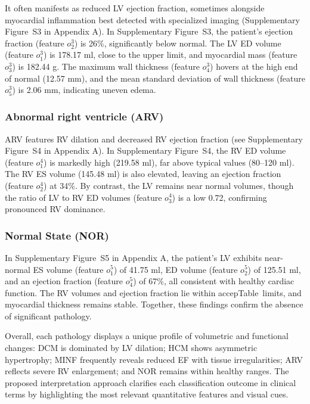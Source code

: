\documentclass[fleqn,10pt]{wlscirep}
\begin{document}
It often manifests as reduced LV ejection fraction, sometimes alongside myocardial inflammation best detected with specialized imaging (Supplementary Figure~S3 in Appendix A). In Supplementary Figure~S3, the patient's ejection fraction (feature \(o_2^3\)) is 26\%, significantly below normal. The LV ED volume (feature \(o_1^3\)) is 178.17 ml, close to the upper limit, and myocardial mass (feature \(o_3^3\)) is 182.44 g. The maximum wall thickness (feature \(o_4^3\)) hovers at the high end of normal (12.57 mm), and the mean standard deviation of wall thickness (feature \(o_5^3\)) is 2.06 mm, indicating uneven edema.

\subsubsection*{Abnormal right ventricle (ARV)}

ARV features RV dilation and decreased RV ejection fraction (see Supplementary Figure~S4 in Appendix A). In Supplementary Figure~S4, the RV ED volume (feature \(o_1^4\)) is markedly high (219.58 ml), far above typical values (80--120 ml). The RV ES volume (145.48 ml) is also elevated, leaving an ejection fraction (feature \(o_2^4\)) at 34\%. By contrast, the LV remains near normal volumes, though the ratio of LV to RV ED volumes (feature \(o_3^4\)) is a low 0.72, confirming pronounced RV dominance.

\subsubsection*{Normal State (NOR)}

In Supplementary Figure~S5 in Appendix A, the patient's LV exhibits near-normal ES volume (feature \(o_1^5\)) of 41.75 ml, ED volume (feature \(o_2^5\)) of 125.51 ml, and an ejection fraction (feature \(o_4^5\)) of 67\%, all consistent with healthy cardiac function. The RV volumes and ejection fraction lie within accepTable~limits, and myocardial thickness remains stable. Together, these findings confirm the absence of significant pathology.

Overall, each pathology displays a unique profile of volumetric and functional changes: DCM is dominated by LV dilation; HCM shows asymmetric hypertrophy; MINF frequently reveals reduced EF with tissue irregularities; ARV reflects severe RV enlargement; and NOR remains within healthy ranges. The proposed interpretation approach clarifies each classification outcome in clinical terms by highlighting the most relevant quantitative features and visual cues.
\end{document}
